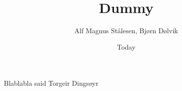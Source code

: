 \documentclass{article}
\begin{document}
\title{Dummy}
\author{Alf Magnus Stålesen, Bjørn Dølvik}
\date{Today}
\maketitle

Blablabla said Torgeir Dingsøyr ~\cite{Dingsøyr2013}



\end{document}
